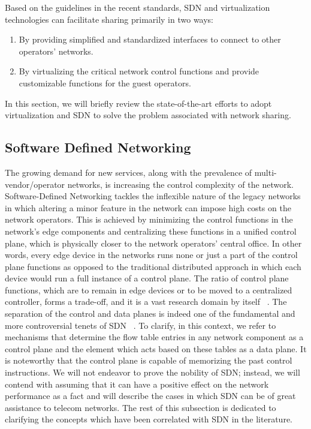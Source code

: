 
Based on the guidelines in the recent standards, \ac{SDN} and virtualization technologies can facilitate sharing primarily in two ways: 
\begin{enumerate}
    \item By providing simplified and standardized interfaces to connect to other operators' networks.
    \item By virtualizing the critical network control functions and provide customizable functions for the guest operators.
\end{enumerate}

In this section, we will briefly review the state-of-the-art efforts to adopt virtualization and \ac{SDN} to solve the problem associated with network sharing.

\subsection{Software Defined Networking}

The growing demand for new services, along with the prevalence of multi-vendor/operator networks, is increasing the control complexity of the network. Software-Defined Networking tackles the inflexible nature of the legacy networks in which altering a minor feature in the network can impose high costs on the network operators. This is achieved by minimizing the control functions in the network's edge components and centralizing these functions in a unified control plane, which is physically closer to the network operators' central office. In other words, every edge device in the networks runs none or just a part of the control plane functions as opposed to the traditional distributed approach in which each device would run a full instance of a control plane. The ratio of control plane functions, which are to remain in edge devices or to be moved to a centralized controller, forms a trade-off, and it is a vast research domain by itself ~\cite{Levin:2012:LCS:2342441.2342443,6461198,7218382,7367345}. The separation of the control and data planes is indeed one of the fundamental and more controversial tenets of \ac{SDN} ~\cite{D.:2013:SSD:2566940}. To clarify, in this context, we refer to mechanisms that determine the flow table entries in any network component as a control plane and the element which acts based on these tables as a data plane. It is noteworthy that the control plane is capable of memorizing the past control instructions.
We will not endeavor to prove the nobility of SDN; instead, we will contend with assuming that it can have a positive effect on the network performance as a fact and will describe the cases in which \ac{SDN} can be of great assistance to telecom networks.
The rest of this subsection is dedicated to clarifying the concepts which have been correlated with \ac{SDN} in the literature.

